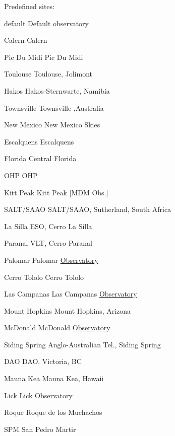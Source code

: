 Predefined sites\-: \par
 default Default observatory \par
 Calern Calern \par
 Pic Du Midi Pic Du Midi \par
 Toulouse Toulouse, Jolimont \par
 Hakos Hakos-\/\-Sternwarte, Namibia \par
 Townsville Townsville ,Australia \par
 New Mexico New Mexico Skies \par
 Escalquens Escalquens \par
 Florida Central Florida \par
 O\-H\-P O\-H\-P \par
 Kitt Peak Kitt Peak \mbox{[}M\-D\-M Obs.\mbox{]} \par
 S\-A\-L\-T/\-S\-A\-A\-O S\-A\-L\-T/\-S\-A\-A\-O, Sutherland, South Africa \par
 La Silla E\-S\-O, Cerro La Silla \par
 Paranal V\-L\-T, Cerro Paranal \par
 Palomar Palomar \hyperlink{class_observatory}{Observatory} \par
 Cerro Tololo Cerro Tololo \par
 Las Campanas Las Campanas \hyperlink{class_observatory}{Observatory} \par
 Mount Hopkins Mount Hopkins, Arizona \par
 Mc\-Donald Mc\-Donald \hyperlink{class_observatory}{Observatory} \par
 Siding Spring Anglo-\/\-Australian Tel., Siding Spring \par
 D\-A\-O D\-A\-O, Victoria, B\-C \par
 Mauna Kea Mauna Kea, Hawaii \par
 Lick Lick \hyperlink{class_observatory}{Observatory} \par
 Roque Roque de los Muchachos \par
 S\-P\-M San Pedro Martir \par
 \par
 

